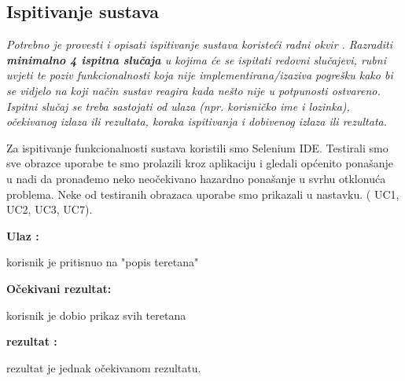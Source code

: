 			\subsection{Ispitivanje sustava}
			
			 \textit{Potrebno je provesti i opisati ispitivanje sustava koristeći radni okvir . Razraditi \textbf{minimalno 4 ispitna slučaja} u kojima će se ispitati redovni slučajevi, rubni uvjeti te poziv funkcionalnosti koja nije implementirana/izaziva pogrešku kako bi se vidjelo na koji način sustav reagira kada nešto nije u potpunosti ostvareno. Ispitni slučaj se treba sastojati od ulaza (npr. korisničko ime i lozinka), očekivanog izlaza ili rezultata, koraka ispitivanja i dobivenog izlaza ili rezultata.\\ }
			 
		
		 	 Za ispitivanje funkcionalnosti sustava koristili smo Selenium IDE. Testirali smo
		 	 sve obrazce uporabe te smo prolazili kroz aplikaciju i gledali općenito ponašanje
		 	 u nadi da pronađemo neko neočekivano hazardno ponašanje u svrhu otklonuća problema.
		 	 Neke od testiranih obrazaca uporabe smo prikazali u nastavku. ( UC1, UC2, UC3, UC7).
		 	 
		 	 
	
	            \noindent {}
                \begin{packed_item}
						\item  \textbf{Ulaz : } 
						\item[] \begin{packed_enum}
	
							\item korisnik je pritisnuo na "popis teretana"

						\end{packed_enum}
						\item  \textbf{Očekivani rezultat: } 
						\item[] \begin{packed_enum}
	
							\item korisnik je dobio prikaz svih teretana

						\end{packed_enum}
						
						\item  \textbf{rezultat : }
						\item[] \begin{packed_enum}
	
							\item rezultat je jednak očekivanom rezultatu.

						\end{packed_enum}

				\end{packed_item}
				
